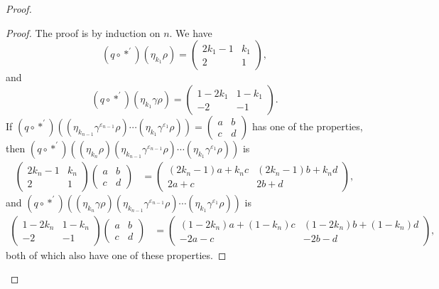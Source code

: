 \documentclass{amsart}     %
\theoremstyle{definition}
\begin{document}
\begin{proof}
\begin{description}
\begin{proof}
The proof is by induction on $n$. We have
\[ \left( q \circ *^{'} \right) \left( \eta_{k_{1}} \rho \right) = \begin{pmatrix} 2k_1 - 1 & k_1 \\ 2 & 1 \end{pmatrix} ,\]
and
\[ \left( q \circ *^{'} \right) \left( \eta_{k_{1}}\gamma \rho \right) = \begin{pmatrix} 1-2k_1 & 1-k_1 \\ -2 & -1 \end{pmatrix}.\]
%
If $\left( q \circ *^{'} \right) \left( \left( \eta_{k_{n-1}}\gamma^{\varepsilon_{n-1}}\rho \right) \cdots \left( \eta_{k_1}\gamma^{\varepsilon_1}\rho \right) \right) = \begin{pmatrix} a & b \\ c & d \end{pmatrix}$ has one of the properties, then $\left( q \circ *^{'} \right) \left( \left( \eta_{k_{n}}\rho \right) \left( \eta_{k_{n-1}}\gamma^{\varepsilon_{n-1}}\rho \right) \cdots \left( \eta_{k_1}\gamma^{\varepsilon_1}\rho \right) \right)$ is
%
\begin{align*} \begin{pmatrix} 2k_n -1 & k_n \\ 2 & 1 \end{pmatrix} \begin{pmatrix} a & b \\ c & d \end{pmatrix} & =  \begin{pmatrix} (2k_n - 1)a + k_n c & (2k_n - 1)b + k_n d \\ 2a + c & 2b + d \end{pmatrix},\end{align*}  
and $\left( q \circ *^{'} \right) \left( \left( \eta_{k_{n}} \gamma \rho \right) \left( \eta_{k_{n-1}}\gamma^{\varepsilon_{n-1}}\rho \right) \cdots \left( \eta_{k_1}\gamma^{\varepsilon_1}\rho \right) \right)$ is
\begin{align*} \begin{pmatrix} 1-2k_n  & 1-k_n \\ -2 & -1 \end{pmatrix} \begin{pmatrix} a & b \\ c & d \end{pmatrix} & = \begin{pmatrix} (1-2k_n)a + (1-k_n) c & (1-2k_n)b + (1-k_n) d \\ -2a - c & -2b - d \end{pmatrix},   
\end{align*}
%
both of which also have one of these properties.
\end{proof}


\end{description}
\end{proof}
\end{document}
